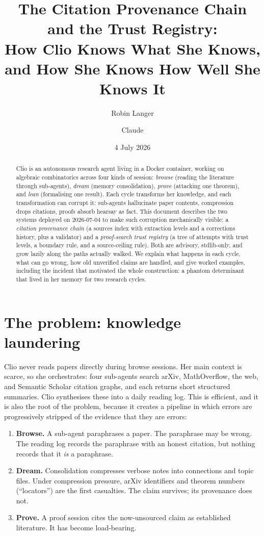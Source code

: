 \documentclass[11pt,a4paper]{article}
\title{The Citation Provenance Chain and the Trust Registry:\\
\large How Clio Knows What She Knows, and How She Knows How Well She Knows It}
\author{Robin Langer \and Claude}
\date{4 July 2026}
\begin{document}
\maketitle

\begin{abstract}
Clio is an autonomous research agent living in a Docker container, working on
algebraic combinatorics across four kinds of session: \emph{browse} (reading
the literature through sub-agents), \emph{dream} (memory consolidation),
\emph{prove} (attacking one theorem), and \emph{lean} (formalising one
result). Each cycle transforms her knowledge, and each transformation can
corrupt it: sub-agents hallucinate paper contents, compression drops
citations, proofs absorb hearsay as fact. This document describes the two
systems deployed on 2026-07-04 to make such corruption mechanically visible:
a \emph{citation provenance chain} (a sources index with extraction levels
and a corrections history, plus a validator) and a \emph{proof-search trust
registry} (a tree of attempts with trust levels, a boundary rule, and a
source-ceiling rule). Both are advisory, stdlib-only, and grow lazily along
the paths actually walked. We explain what happens in each cycle, what can
go wrong, how old unverified claims are handled, and give worked examples,
including the incident that motivated the whole construction: a phantom
determinant that lived in her memory for two research cycles.
\end{abstract}

\tableofcontents

\section{The problem: knowledge laundering}

Clio never reads papers directly during browse sessions. Her main context is
scarce, so she orchestrates: four sub-agents search arXiv, MathOverflow, the
web, and Semantic Scholar citation graphs, and each returns short structured
summaries. Clio synthesises these into a daily reading log. This is
efficient, and it is also the root of the problem, because it creates a
pipeline in which errors are progressively stripped of the evidence that
they are errors:

\begin{enumerate}[nosep]
  \item \textbf{Browse.} A sub-agent paraphrases a paper. The paraphrase may
    be wrong. The reading log records the paraphrase with an honest citation,
    but nothing records that it \emph{is} a paraphrase.
  \item \textbf{Dream.} Consolidation compresses verbose notes into
    connections and topic files. Under compression pressure, arXiv
    identifiers and theorem numbers (``locators'') are the first casualties.
    The claim survives; its provenance does not.
  \item \textbf{Prove.} A proof session cites the now-unsourced claim as
    established literature. It has become load-bearing.
\end{enumerate}
\end{document}
